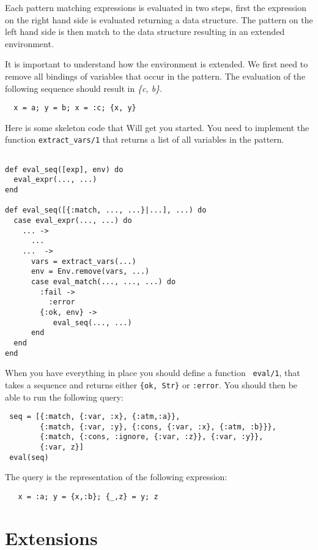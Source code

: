 \documentclass[a4paper,11pt]{article}
\begin{document}
Each pattern matching expressions is evaluated in two steps, first the
expression on the right hand side is evaluated returning a data
structure. The pattern on the left hand side is then match to the data
structure resulting in an extended environment.

It is important to understand how the environment is extended. We
first need to remove all bindings of variables that occur in the
pattern. The evaluation of the following sequence should result in {\em \{c, b\}}.

\begin{verbatim}
  x = a; y = b; x = :c; {x, y}
\end{verbatim}

Here is some skeleton code that Will get you started. You need to
implement the function {\tt extract_vars/1} that returns a list of all
variables in the pattern.

\begin{verbatim}

def eval_seq([exp], env) do
  eval_expr(..., ...)
end
    
def eval_seq([{:match, ..., ...}|...], ...) do
  case eval_expr(..., ...) do
    ... -> 
      ...
    ...  ->
      vars = extract_vars(...)
      env = Env.remove(vars, ...)
      case eval_match(..., ..., ...) do
        :fail ->
          :error
        {:ok, env} ->
           eval_seq(..., ...)
      end
  end
end
\end{verbatim}

When you have everything in place you should define a function {\tt
  eval/1}, that takes a sequence and returns either {\tt \{ok, Str\}}
or {\tt :error}. You should then be able to run the following query:

\begin{verbatim}
 seq = [{:match, {:var, :x}, {:atm,:a}},
        {:match, {:var, :y}, {:cons, {:var, :x}, {:atm, :b}}},
        {:match, {:cons, :ignore, {:var, :z}}, {:var, :y}},
        {:var, z}]
 eval(seq)
\end{verbatim}

The query is the representation of the following expression:

\begin{verbatim}
   x = :a; y = {x,:b}; {_,z} = y; z
\end{verbatim}

\section{Extensions}
\end{document}

